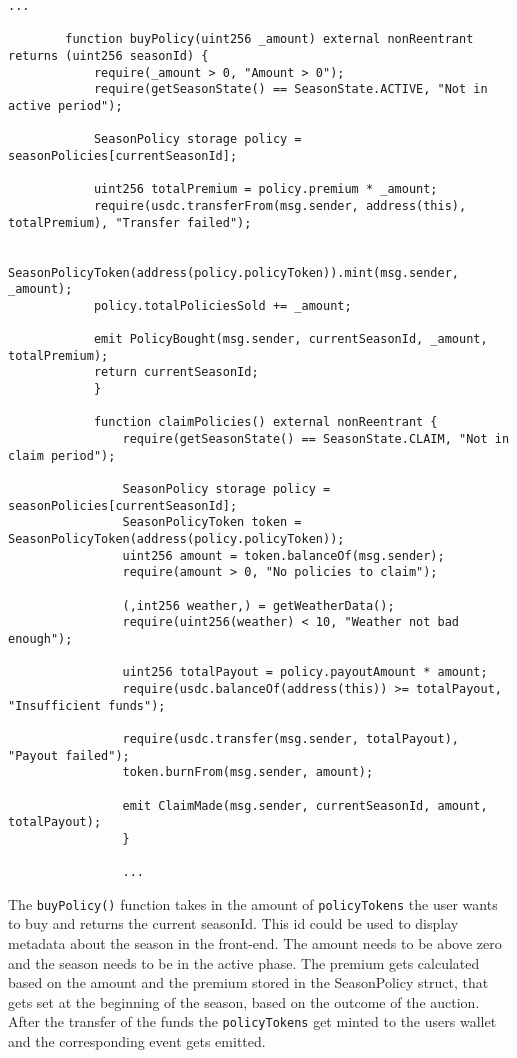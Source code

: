 \documentclass[11pt,a4paper]{article}
\begin{document}
		\begin{lstlisting}[style=soliditystyle, caption={RainyDayFund.sol - Main Insurance Contract},label={lst:lstlisting3}]
		...

		function buyPolicy(uint256 _amount) external nonReentrant returns (uint256 seasonId) {
			require(_amount > 0, "Amount > 0");
			require(getSeasonState() == SeasonState.ACTIVE, "Not in active period");

			SeasonPolicy storage policy = seasonPolicies[currentSeasonId];

			uint256 totalPremium = policy.premium * _amount;
			require(usdc.transferFrom(msg.sender, address(this), totalPremium), "Transfer failed");

			SeasonPolicyToken(address(policy.policyToken)).mint(msg.sender, _amount);
			policy.totalPoliciesSold += _amount;

			emit PolicyBought(msg.sender, currentSeasonId, _amount, totalPremium);
			return currentSeasonId;
			}

			function claimPolicies() external nonReentrant {
				require(getSeasonState() == SeasonState.CLAIM, "Not in claim period");

				SeasonPolicy storage policy = seasonPolicies[currentSeasonId];
				SeasonPolicyToken token = SeasonPolicyToken(address(policy.policyToken));
				uint256 amount = token.balanceOf(msg.sender);
				require(amount > 0, "No policies to claim");

				(,int256 weather,) = getWeatherData();
				require(uint256(weather) < 10, "Weather not bad enough");

				uint256 totalPayout = policy.payoutAmount * amount;
				require(usdc.balanceOf(address(this)) >= totalPayout, "Insufficient funds");

				require(usdc.transfer(msg.sender, totalPayout), "Payout failed");
				token.burnFrom(msg.sender, amount);

				emit ClaimMade(msg.sender, currentSeasonId, amount, totalPayout);
				}

				...
		\end{lstlisting}

		The \texttt{buyPolicy()} function takes in the amount of \texttt{policyTokens} the user wants to buy and returns the current seasonId.
		This id could be used to display metadata about the season in the front-end.
		The amount needs to be above zero and the season needs to be in the active phase.
		The premium gets calculated based on the amount and the premium stored in the SeasonPolicy struct, that gets set at the beginning of the season, based on the outcome of the auction.
		After the transfer of the funds the \texttt{policyTokens} get minted to the users wallet and the corresponding event gets emitted.
\end{document}
